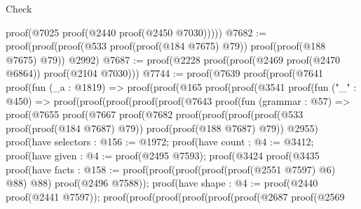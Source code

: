 \begin{lexlean}{Check}
\begin{coremodule}
          proof(@7025 proof(@2440 proof(@2450 @7030)))))
@7682 := proof(proof(proof(@533 proof(proof(@184 @7675) @79)) proof(proof(@188 @7675) @79)) @2992)
@7687 := proof(@2228 proof(proof(@2469 proof(@2470 @6864)) proof(@2104 @7030)))
@7744 := proof(@7639
      proof(proof(@7641
            proof(fun (_a : @1819) =>
              proof(proof(@165
                    proof(proof(@3541
                          proof(fun ("_" : @450) =>
                            proof(proof(proof(proof(proof(@7643
                                        proof(fun (grammar : @57) =>
                                          proof(@7655
                                              proof(@7667
                                                  proof(@7682
                                                      proof(proof(proof(proof(@533
                                                                proof(proof(@184 @7687) @79))
                                                              proof(proof(@188 @7687) @79))
                                                            @2955)
                                                          proof(have selectors : @156 := @1972;
                                                            proof(have count : @4 := @3412;
                                                              proof(have given : @4 := proof(@2495
                                                                    @7593);
                                                                proof(@3424
                                                                    proof(@3435
                                                                        proof(have facts : @158 := proof(proof(proof(proof(proof(@2551
                                                                                      @7597)
                                                                                    @6)
                                                                                  @88)
                                                                                @88)
                                                                              proof(@2496 @7588));
                                                                          proof(have shape : @4 := proof(@2440
                                                                                proof(@2441 @7597));
                                                                            proof(proof(proof(proof(proof(proof(@2687
                                                                                          proof(@2569

\end{coremodule}
\end{lexlean}
